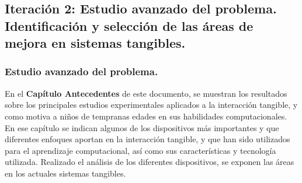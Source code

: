 \subsection{Iteración 2: Estudio avanzado del problema. Identificación y selección de las áreas de mejora en sistemas tangibles.}

\subsubsection{Estudio avanzado del problema.}
En el \textbf{Capítulo Antecedentes} de este documento, se muestran los resultados sobre los principales estudios experimentales aplicados a la interacción tangible, y como motiva a niños de tempranas edades en sus habilidades computacionales. En ese capítulo se indican algunos de los dispositivos más importantes y que diferentes enfoques aportan en la interacción tangible, y que han sido utilizados para el aprendizaje computacional, así como sus características y tecnología utilizada. 
Realizado el análisis de los diferentes dispositivos, se exponen las áreas en los actuales sistemas tangibles.

